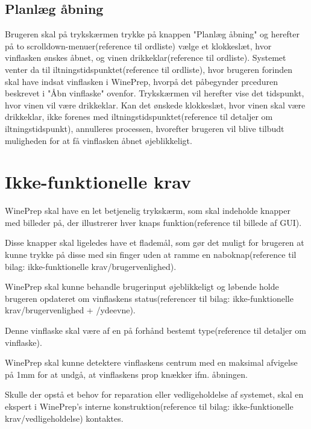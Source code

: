 \subsection{Planlæg åbning}
Brugeren skal på trykskærmen trykke på knappen "Planlæg åbning" og herefter på to scrolldown-menuer(reference til ordliste) vælge et klokkeslæt, hvor vinflasken ønskes åbnet, og vinen drikkeklar(reference til ordliste). Systemet venter da til iltningstidspunktet(reference til ordliste), hvor brugeren forinden skal have indsat vinflasken i WinePrep, hvorpå det påbegynder prceduren beskrevet i "Åbn vinflaske" ovenfor. Trykskærmen vil herefter vise det tidspunkt, hvor vinen vil være drikkeklar. Kan det ønskede klokkeslæt, hvor vinen skal være drikkeklar, ikke forenes med iltningstidspunktet(reference til detaljer om iltningstidspunkt), annulleres processen, hvorefter brugeren vil blive tilbudt muligheden for at få vinflasken åbnet øjeblikkeligt.

\section{Ikke-funktionelle krav}
WinePrep skal have en let betjenelig trykskærm, som skal indeholde knapper med billeder på, der illustrerer hver knaps funktion(reference til billede af GUI).

Disse knapper skal ligeledes have et flademål, som gør det muligt for brugeren at kunne trykke på disse med sin finger uden at ramme en naboknap(reference til bilag: ikke-funktionelle krav/brugervenlighed).

WinePrep skal kunne behandle brugerinput øjeblikkeligt og løbende holde brugeren opdateret om vinflaskens status(referencer til bilag: ikke-funktionelle krav/brugervenlighed + /ydeevne).

Denne vinflaske skal være af en på forhånd bestemt type(reference til detaljer om vinflaske).

WinePrep skal kunne detektere vinflaskens centrum med en maksimal afvigelse på 1mm for at undgå, at vinflaskens prop knækker ifm. åbningen.

Skulle der opstå et behov for reparation eller vedligeholdelse af systemet, skal en ekspert i WinePrep's interne konstruktion(reference til bilag: ikke-funktionelle krav/vedligeholdelse) kontaktes.
